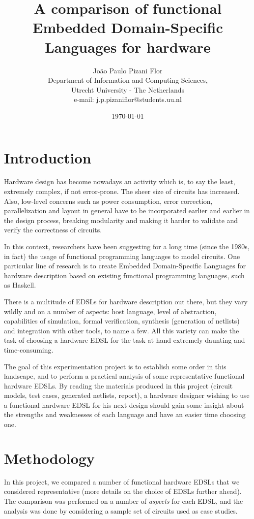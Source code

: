 \documentclass[a4paper]{article}
\title{A comparison of functional Embedded Domain-Specific Languages for hardware}
\date{\today}
\author
{
    João Paulo Pizani Flor \\
    Department of Information and Computing Sciences, \\
    Utrecht University - The Netherlands \\
    e-mail: j.p.pizaniflor@students.uu.nl
}
\begin{document}
    \maketitle

    \section{Introduction}
    \label{sec:intro}
        Hardware design has become nowadays an activity which is, to say the least, extremely
        complex, if not error-prone. The sheer size of circuits has increased. Also, low-level
        concerns such as power consumption, error correction, parallelization and layout
        in general have to be incorporated earlier and earlier in the design process, breaking
        modularity and making it harder to validate and verify the correctness of circuits.

        In this context, researchers have been suggesting for a long time (since the 1980s, in
        fact) the usage of functional programming languages to model circuits. One particular line
        of research is to create Embedded Domain-Specific Languages for hardware description based
        on existing functional programming languages, such as Haskell.

        There is a multitude of EDSLs for hardware description out there, but they vary wildly and
        on a number of aspects: host language, level of abstraction, capabilities of simulation,
        formal verification, synthesis (generation of netlists) and integration with other tools, to
        name a few. All this variety can make the task of choosing a hardware EDSL for the task at
        hand extremely daunting and time-consuming.

        The goal of this experimentation project is to establish some order in this landscape, and
        to perform a practical analysis of some representative functional hardware EDSLs. By reading
        the materials produced in this project (circuit models, test cases, generated netlists,
        report), a hardware designer wishing to use a functional hardware EDSL for his next design
        should gain some insight about the strengths and weaknesses of each language and have an
        easier time choosing one.

    \section{Methodology}
    \label{sec:methods}
        In this project, we compared a number of functional hardware EDSLs that we considered
        representative (more details on the choice of EDSLs further ahead). The comparison was
        performed on a number of \emph{aspects} for each EDSL, and the analysis was done by
        considering a sample set of circuits used as case studies.
\end{document}
